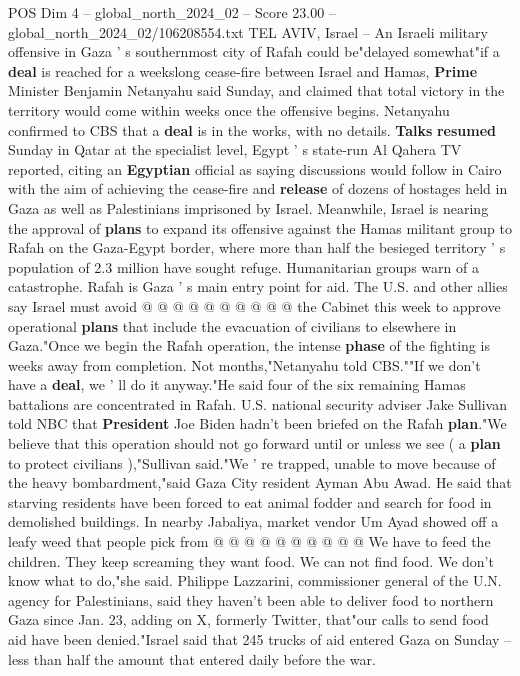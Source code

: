\begin{textsample}{POS Dim 4 – global\_north\_2024\_02 – Score 23.00 – global\_north\_2024\_02/106208554.txt}  \label{ex:f4_pos_187}
TEL AVIV, Israel -- An Israeli military offensive in Gaza ' s southernmost city of Rafah could be"delayed somewhat"if a \textbf{deal} is reached for a weekslong cease-fire between Israel and Hamas, \textbf{Prime} Minister Benjamin Netanyahu said Sunday, and claimed that total victory in the territory would come within weeks once the offensive begins.
Netanyahu confirmed to CBS that a \textbf{deal} is in the works, with no details. \textbf{Talks} \textbf{resumed} Sunday in Qatar at the specialist level, Egypt ' s state-run Al Qahera TV reported, citing an \textbf{Egyptian} official as saying discussions would follow in Cairo with the aim of achieving the cease-fire and \textbf{release} of dozens of hostages held in Gaza as well as Palestinians imprisoned by Israel.
Meanwhile, Israel is nearing the approval of \textbf{plans} to expand its offensive against the Hamas militant group to Rafah on the Gaza-Egypt border, where more than half the besieged territory ' s population of 2.3 million have sought refuge.
Humanitarian groups warn of a catastrophe.
Rafah is Gaza ' s main entry point for aid.
The U.S. and other allies say Israel must avoid @ @ @ @ @ @ @ @ @ @ the Cabinet this week to approve operational \textbf{plans} that include the evacuation of civilians to elsewhere in Gaza."Once we begin the Rafah operation, the intense \textbf{phase} of the fighting is weeks away from completion.
Not months,"Netanyahu told CBS.""If we don't have a \textbf{deal}, we ' ll do it anyway."He said four of the six remaining Hamas battalions are concentrated in Rafah.
U.S. national security adviser Jake Sullivan told NBC that \textbf{President} Joe Biden hadn't been briefed on the Rafah \textbf{plan}."We believe that this operation should not go forward until or unless we see ( a \textbf{plan} to protect civilians ),"Sullivan said."We ' re trapped, unable to move because of the heavy bombardment,"said Gaza City resident Ayman Abu Awad.
He said that starving residents have been forced to eat animal fodder and search for food in demolished buildings.
In nearby Jabaliya, market vendor Um Ayad showed off a leafy weed that people pick from @ @ @ @ @ @ @ @ @ @ We have to feed the children.
They keep screaming they want food.
We can not find food.
We don't know what to do,"she said.
Philippe Lazzarini, commissioner general of the U.N. agency for Palestinians, said they haven't been able to deliver food to northern Gaza since Jan. 23, adding on X, formerly Twitter, that"our calls to send food aid have been denied."Israel said that 245 trucks of aid entered Gaza on Sunday -- less than half the amount that entered daily before the war.

\end{textsample}
